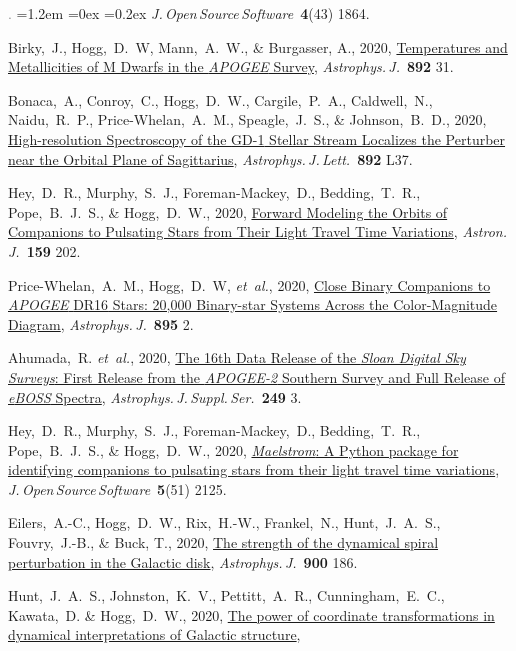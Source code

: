 \documentclass[10pt,letterpaper]{article}
\newcommand{\acronym}[1]{{\small{#1}}}
\newcommand{\foreign}[1]{\textsl{#1}}
\newcommand{\etal}{\foreign{et~al.}}
\newcommand{\project}[1]{\textsl{#1}}
\newcommand{\doi}[2]{\href{http://dx.doi.org/#1}{{#2}}}
\newcommand{\deemph}[1]{\textcolor{grey}{\footnotesize{#1}}}
\newcommand{\pubnumber}[1]{\deemph{{#1}.}}
\newcounter{refpubnum}
\newcommand{\hogglist}{%
    \rightmargin=0in
    \leftmargin=1.2em
    \topsep=0ex
    \partopsep=0pt
    \itemsep=0.2ex
    \parsep=0pt
    \itemindent=-1.0\leftmargin
    \listparindent=0.0\leftmargin
    \settowidth{\labelsep}{~}
    \usecounter{refpubnum}
  }
\begin{document}
\begin{list}{\pubnumber{\therefpubnum}}{\hogglist}
\textit{J.\,Open\,Source\,Software}\ \textbf{4}(43) 1864.
\item
Birky,~J., Hogg,~D.~W, Mann,~A.~W., \& Burgasser, A., 2020,
\doi{10.3847/1538-4357/ab7004}{Temperatures and Metallicities of M Dwarfs in the \project{\acronym{APOGEE}} Survey},
\textit{Astrophys.\,J.}\ \textbf{892} 31.
\item
  Bonaca,~A., Conroy,~C., Hogg,~D.~W., Cargile,~P.~A., Caldwell,~N., Naidu,~R.~P.,
  Price-Whelan,~A.~M., Speagle,~J.~S., \& Johnson,~B.~D., 2020,
  \doi{10.3847/2041-8213/ab800c}{High-resolution Spectroscopy of the \acronym{GD-1} Stellar Stream Localizes the Perturber near the Orbital Plane of Sagittarius},
  \textit{Astrophys.\,J.\,Lett.}\ \textbf{892} L37.
\item
  Hey,~D.~R., Murphy,~S.~J., Foreman-Mackey,~D., Bedding,~T.~R.,
  Pope,~B.~J.~S., \& Hogg,~D.~W., 2020,
  \doi{10.3847/1538-3881/ab7d38}{Forward Modeling the Orbits of Companions to Pulsating Stars from Their Light Travel Time Variations},
  \textit{Astron.\,J.}\ \textbf{159} 202.
\item
  Price-Whelan,~A.~M., Hogg,~D.~W, \etal, 2020,
  \doi{10.3847/1538-4357/ab8acc}{Close Binary Companions to \project{\acronym{APOGEE}} \acronym{DR16} Stars: 20,000 Binary-star Systems Across the Color-Magnitude Diagram},
  \textit{Astrophys.\,J.}\ \textbf{895} 2.
\item
  Ahumada,~R. \etal, 2020,
  \doi{10.3847/1538-4365/ab929e}{The 16th Data Release of the \project{Sloan Digital Sky Surveys}: First Release from the \project{\acronym{APOGEE-2}} Southern Survey and Full Release of \project{e\acronym{BOSS}} Spectra},
  \textit{Astrophys.\,J.\,Suppl.\,Ser.}\ \textbf{249} 3.
\item
  Hey,~D.~R., Murphy,~S.~J., Foreman-Mackey,~D., Bedding,~T.~R.,
  Pope,~B.~J.~S., \& Hogg,~D.~W., 2020,
  \doi{10.21105/joss.02125}{\project{Maelstrom}: A Python package for identifying companions to pulsating stars from their light travel time variations},
  \textit{J.\,Open\,Source\,Software}\ \textbf{5}(51) 2125.
\item
  Eilers,~A.-C., Hogg,~D.~W., Rix,~H.-W., Frankel,~N., Hunt,~J.~A.~S., Fouvry,~J.-B.,
  \& Buck, T., 2020,
  \doi{10.3847/1538-4357/abac0b}{The strength of the dynamical spiral perturbation in the Galactic disk},
  \textit{Astrophys.\,J.}\ \textbf{900} 186.
\item
  Hunt,~J.~A.~S., Johnston,~K.~V., Pettitt,~A.~R., Cunningham,~E.~C., Kawata,~D. \& Hogg,~D.~W., 2020,
  \doi{10.1093/mnras/staa1987}{The power of coordinate transformations in dynamical interpretations of Galactic structure},

\end{list}
\end{document}
